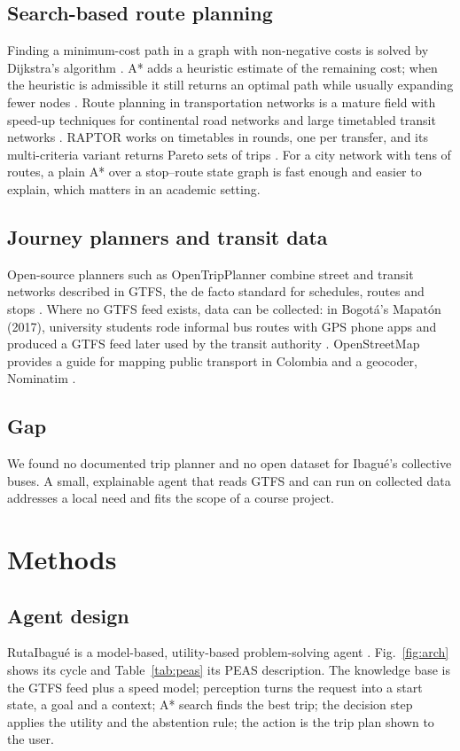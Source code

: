 \documentclass[10pt,twocolumn,letterpaper]{article}
\begin{document}
\subsection{Search-based route planning}
Finding a minimum-cost path in a graph with non-negative costs is solved by Dijkstra's algorithm \cite{dijkstra1959}. A* adds a heuristic estimate of the remaining cost; when the heuristic is admissible it still returns an optimal path while usually expanding fewer nodes \cite{hart1968,russell2020}. Route planning in transportation networks is a mature field with speed-up techniques for continental road networks and large timetabled transit networks \cite{bast2016}. RAPTOR works on timetables in rounds, one per transfer, and its multi-criteria variant returns Pareto sets of trips \cite{delling2015}. For a city network with tens of routes, a plain A* over a stop--route state graph is fast enough and easier to explain, which matters in an academic setting.

\subsection{Journey planners and transit data}
Open-source planners such as OpenTripPlanner \cite{otp} combine street and transit networks described in GTFS, the de facto standard for schedules, routes and stops \cite{gtfs}. Where no GTFS feed exists, data can be collected: in Bogotá's Mapatón (2017), university students rode informal bus routes with GPS phone apps and produced a GTFS feed later used by the transit authority \cite{mapaton}. OpenStreetMap provides a guide for mapping public transport in Colombia \cite{osmguide} and a geocoder, Nominatim \cite{nominatim}.

\subsection{Gap}
We found no documented trip planner and no open dataset for Ibagué's collective buses. A small, explainable agent that reads GTFS and can run on collected data addresses a local need and fits the scope of a course project.

\section{Methods}\label{sec:methods}
\subsection{Agent design}
RutaIbagué is a model-based, utility-based problem-solving agent \cite{russell2020}. Fig.~\ref{fig:arch} shows its cycle and Table~\ref{tab:peas} its PEAS description. The knowledge base is the GTFS feed plus a speed model; perception turns the request into a start state, a goal and a context; A* search finds the best trip; the decision step applies the utility and the abstention rule; the action is the trip plan shown to the user.
\end{document}
